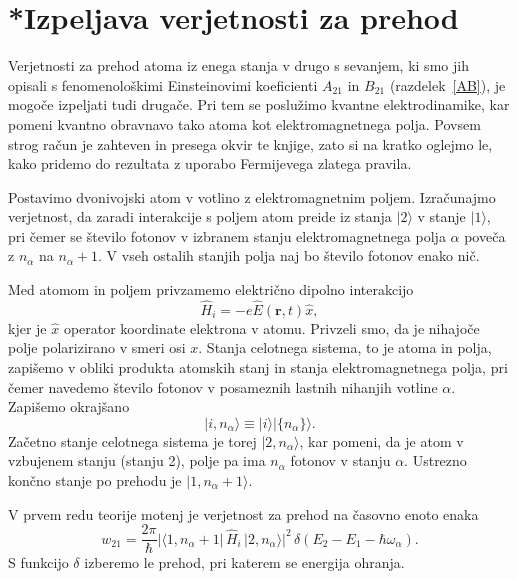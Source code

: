 \section{*Izpeljava verjetnosti za prehod}
\label{chap:verjetnost}
Verjetnosti za prehod atoma iz enega stanja v drugo s sevanjem, ki
smo jih opisali s fenomenološkimi Einsteinovimi koeficienti $A_{21}$
in $B_{21}$ (razdelek~\ref{AB}), 
je mogoče izpeljati tudi drugače.
Pri tem se poslužimo kvantne elektrodinamike, 
kar pomeni kvantno obravnavo 
tako atoma kot elektromagnetnega polja. Povsem strog račun je zahteven in presega
okvir te knjige, zato si na kratko oglejmo le, kako pridemo do rezultata z uporabo
Fermijevega zlatega pravila.

Postavimo dvonivojski atom v votlino z elektromagnetnim poljem.
Izračunajmo verjetnost, da zaradi interakcije s poljem atom
preide iz stanja $|2\rangle$ v stanje $|1\rangle$, pri čemer se
število fotonov v izbranem stanju elektromagnetnega polja $\alpha$
poveča z $n_{\alpha}$ na $n_{\alpha}+1$. V vseh ostalih stanjih
polja naj bo število fotonov enako nič.

Med atomom in poljem privzamemo električno dipolno interakcijo 
\begin{equation}
\hat{H}_{i}=-e\hat{E}(\mathbf{r},t)\hat{x},
\label{4.47}
\end{equation}
kjer je $\hat{x}$ operator koordinate elektrona v atomu. 
Privzeli
smo, da je nihajoče polje polarizirano v smeri osi $x$. Stanja celotnega sistema, 
to je atoma in polja, zapišemo v obliki produkta atomskih stanj in
stanja elektromagnetnega polja, pri čemer navedemo število fotonov
v posameznih lastnih nihanjih votline $\alpha$. Zapišemo okrajšano
\begin{equation}
|i,n_{\alpha}\rangle\equiv|i\rangle|\{n_{\alpha}\}\rangle.
\label{4.48}
\end{equation}
Začetno stanje celotnega sistema je torej $|2,n_{\alpha}\rangle$, kar pomeni, da je
atom v vzbujenem stanju (stanju 2), polje pa ima $n_{\alpha}$ fotonov v stanju $\alpha$.
Ustrezno končno stanje po prehodu je $|1,n_{\alpha}+1\rangle$.

V prvem redu teorije motenj je verjetnost za prehod na časovno enoto enaka
\begin{equation}
w_{21}=\frac{2\pi}{\hbar}|\langle1,n_{\alpha}+
1|\,\hat{H}_{i}\,|2,n_{\alpha}\rangle|^{2}\,
\delta(E_{2}-E_{1}-\hbar\omega_{\alpha}).
\label{4.49}
\end{equation}
S funkcijo $\delta$ izberemo le prehod, pri katerem se energija ohranja.


